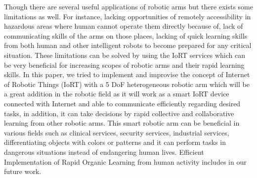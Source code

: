 \documentclass[conference]{IEEEtran}
\begin{document}
Though there are several useful applications of robotic arms but there exists some limitations as well. For instance, lacking opportunities of remotely accessibility in hazardous areas where human cannot operate them directly because of, lack of communicating skills of the arms on those places, lacking of quick learning skills from both human and other intelligent robots to become prepared for any critical situation. These limitations can be solved by using the IoRT services which can be very beneficial for increasing scopes of robotic arms and their rapid learning skills.
In this paper, we tried to implement and improvise the concept of Internet of Robotic Things (IoRT) with a 5 DoF heterogeneous robotic arm which will be a great addition in the robotic field as it will work as a smart IoRT device connected with Internet and able to communicate efficiently regarding desired tasks, in addition, it can take decisions by rapid collective and collaborative learning from other robotic arms. This smart robotic arm can be beneficial in various fields such as clinical services, security services, industrial services, differentiating objects with colors or patterns and it can perform tasks in dangerous situations instead of endangering human lives. Efficient Implementation of Rapid Organic Learning from human activity includes in our future work.
\end{document}
